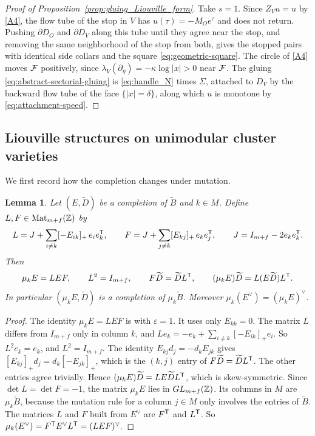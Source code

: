 \documentclass[12pt, letter]{amsart}
\newtheorem{lemma}[dummy]{Lemma}
\theoremstyle{definition}
\begin{document}
\begin{proof}[Proof of Proposition~\ref{prop:gluing_Liouville_form}]
Take $s=1$.
Since $Z_Vu=u$ by \ref{A4}, the flow tube of the stop in $V$ has $u(\tau)=-M_Oe^\tau$ and does not return.
Pushing $\partial D_O$ and $\partial D_V$ along this tube until they agree near the stop, and removing the same neighborhood of the stop from both, gives the stopped pairs with identical side collars and the square \eqref{eq:geometric-square}.
The circle of \ref{A4} moves $\mathcal{F}$ positively, since $\lambda_V(\partial_\eta)=-\kappa\log|x|>0$ near $\mathcal{F}$.
The gluing \eqref{eq:abstract-sectorial-gluing} is \eqref{eq:handle_N} times $\Sigma$, attached to $D_V$ by the backward flow tube of the face $\{|x|=\delta\}$, along which $u$ is monotone by \eqref{eq:attachment-speed}.
\end{proof}


\subsection{Liouville structures on unimodular cluster varieties}\label{sec:cluster-liouville}



We first record how the completion changes under mutation.

\begin{lemma}\label{lem:completion-mutation}
Let $(E,\widetilde D)$ be a completion of $\widetilde B$ and $k\in M$.
Define $L,F\in\operatorname{Mat}_{m+f}(\mathbb{Z})$ by
\[
 L=J+\sum_{i\ne k}[-E_{ik}]_+\,e_ie_k^{\mathsf T},\qquad
 F=J+\sum_{j\ne k}[E_{kj}]_+\,e_ke_j^{\mathsf T},\qquad
 J=I_{m+f}-2e_ke_k^{\mathsf T}.
\]
Then
\[
 \mu_kE=LEF,\qquad L^2=I_{m+f},\qquad F\widetilde D=\widetilde DL^{\mathsf T},\qquad (\mu_kE)\widetilde D=L(E\widetilde D)L^{\mathsf T}.
\]
In particular $(\mu_kE,\widetilde D)$ is a completion of $\mu_k\widetilde B$.
Moreover $\mu_k(E^\vee)=(\mu_kE)^\vee$.
\end{lemma}

\begin{proof}
The identity $\mu_kE=LEF$ is \cite[(3.2) in the proof of Lemma~3.2]{BFZ-III} with $\varepsilon=1$.
It uses only $E_{kk}=0$.
The matrix $L$ differs from $I_{m+f}$ only in column $k$, and $Le_k=-e_k+\sum_{i\ne k}[-E_{ik}]_+e_i$.
So $L^2e_k=e_k$, and $L^2=I_{m+f}$.
The identity $E_{kj}d_j=-d_kE_{jk}$ gives $[E_{kj}]_+d_j=d_k[-E_{jk}]_+$, which is the $(k,j)$ entry of $F\widetilde D=\widetilde DL^{\mathsf T}$.
The other entries agree trivially.
Hence $(\mu_kE)\widetilde D=LE\widetilde DL^{\mathsf T}$, which is skew-symmetric.
Since $\det L=\det F=-1$, the matrix $\mu_kE$ lies in $GL_{m+f}(\mathbb{Z})$.
Its columns in $M$ are $\mu_k\widetilde B$, because the mutation rule for a column $j\in M$ only involves the entries of $\widetilde B$.
The matrices $L$ and $F$ built from $E^\vee$ are $F^{\mathsf T}$ and $L^{\mathsf T}$.
So $\mu_k(E^\vee)=F^{\mathsf T}E^\vee L^{\mathsf T}=(LEF)^\vee$.
\end{proof}
\end{document}
